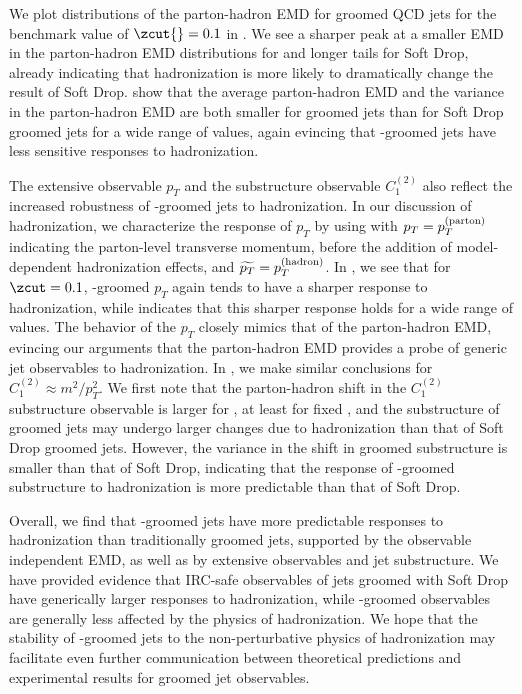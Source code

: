 \documentclass[letterpaper,11pt]{article}
\begin{document}
We plot distributions of the parton-hadron EMD for groomed QCD jets for the benchmark value of $\zcut{}=0.1$ in .
%
We see a sharper peak at a smaller EMD in the parton-hadron EMD distributions for  and longer tails for Soft Drop, already indicating that hadronization is more likely to dramatically change the result of Soft Drop.
%
 show that the average parton-hadron EMD and the variance in the parton-hadron EMD are both smaller for  groomed jets than for Soft Drop groomed jets for a wide range of \zcut{} values, again evincing that \PIRANHA{}-groomed jets have less sensitive responses to hadronization.

The extensive observable \(p_T\) and the substructure observable \(C_1^{(2)}\) also reflect the increased robustness of \PIRANHA{}-groomed jets to hadronization.
%
In our discussion of hadronization, we characterize the response of \(p_T\) by using  with \(p_T = p_T^{\rm(parton)}\) indicating the parton-level transverse momentum, before the addition of model-dependent hadronization effects, and \(\widetilde{p_T} = p_T^{\rm(hadron)}\).
%
In , we see that for \(\zcut = 0.1\), \PIRANHA{}-groomed \(p_T\) again tends to have a sharper response to hadronization, while  indicates that this sharper response holds for a wide range of \zcut{} values.
%
The behavior of the \(p_T\) closely mimics that of the parton-hadron EMD, evincing our arguments that the parton-hadron EMD provides a probe of generic jet observables to hadronization.
%
In , we make similar conclusions for \(C_1^{(2)} \approx m^2 / p_T^2\).
%
We first note that the parton-hadron shift in the \(C_1^{(2)}\) substructure observable is larger for , at least for fixed \zcut{}, and the substructure of  groomed jets may undergo larger changes due to hadronization than that of Soft Drop groomed jets.
%
However, the variance in the shift in  groomed substructure is smaller than that of Soft Drop, indicating that the response of \PIRANHA{}-groomed substructure to hadronization is more predictable than that of Soft Drop.

Overall, we find that \PIRANHA{}-groomed jets have more predictable responses to hadronization than traditionally groomed jets, supported by the observable independent EMD, as well as by extensive observables and jet substructure.
%
We have provided evidence that IRC-safe observables of jets groomed with Soft Drop have generically larger responses to hadronization, while \PIRANHA{}-groomed observables are generally less affected by the physics of hadronization.
%
We hope that the stability of \PIRANHA{}-groomed jets to the non-perturbative physics of hadronization may facilitate even further communication between theoretical predictions and experimental results for groomed jet observables.
\end{document}
